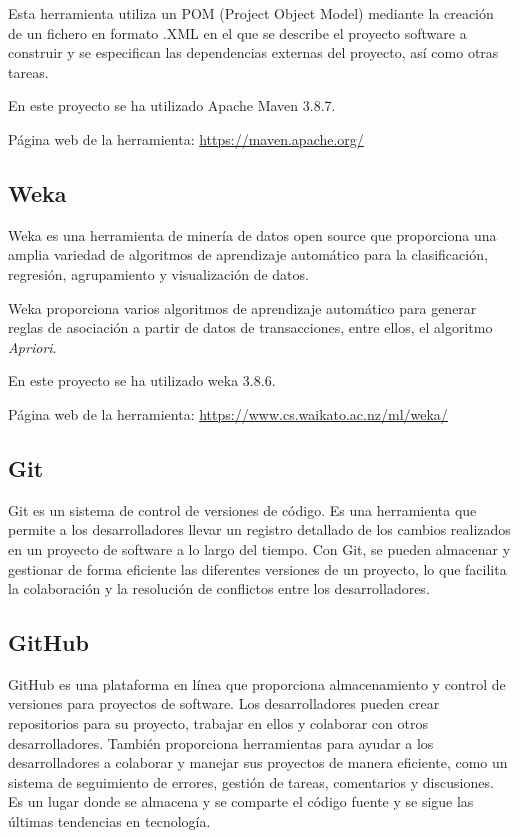 Esta herramienta utiliza un POM (Project Object Model) mediante la creación de un fichero en formato .XML en el que se describe el proyecto software a construir y se especifican las dependencias externas del proyecto, así como otras tareas.\cite{wiki:maven}

En este proyecto se ha utilizado Apache Maven 3.8.7.

Página web de la herramienta: \url{https://maven.apache.org/}

\subsection{Weka}
Weka es una herramienta de minería de datos open source que proporciona una amplia variedad de algoritmos de aprendizaje automático para la clasificación, regresión, agrupamiento y visualización de datos.\cite{wiki:weka}

Weka proporciona varios algoritmos de aprendizaje automático para generar reglas de asociación a partir de datos de transacciones, entre ellos, el algoritmo \textit{Apriori}.

En este proyecto se ha utilizado weka 3.8.6.

Página web de la herramienta: \url{https://www.cs.waikato.ac.nz/ml/weka/}

\subsection{Git}
Git es un sistema de control de versiones de código. Es una herramienta que permite a los desarrolladores llevar un registro detallado de los cambios realizados en un proyecto de software a lo largo del tiempo. Con Git, se pueden almacenar y gestionar de forma eficiente las diferentes versiones de un proyecto, lo que facilita la colaboración y la resolución de conflictos entre los desarrolladores.

\subsection{GitHub}
GitHub es una plataforma en línea que proporciona almacenamiento y control de versiones para proyectos de software. Los desarrolladores pueden crear repositorios para su proyecto, trabajar en ellos y colaborar con otros desarrolladores. También proporciona herramientas para ayudar a los desarrolladores a colaborar y manejar sus proyectos de manera eficiente, como un sistema de seguimiento de errores, gestión de tareas, comentarios y discusiones. Es un lugar donde se almacena y se comparte el código fuente y se sigue las últimas tendencias en tecnología.\cite{wiki:github}

